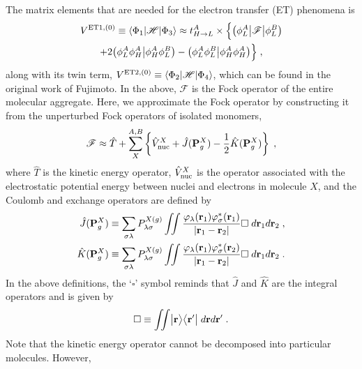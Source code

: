 The matrix elements that are needed for the electron transfer (ET) phenomena
is
%
\begin{multline}\label{e:v0-et1}
 V^{{\rm ET1},(0)} \equiv \left< \Phi_1 \vert \mathscr{H} \vert \Phi_3 \right> \approx 
 t_{H\rightarrow L}^A \times \Big\{ 
 \big( \phi_L^A \big| \mathscr{F} \big| \phi_L^B \big) \\
   + 2 \big( \phi_L^A \phi_H^A \big| \phi_H^A \phi_L^B \big) - \big( \phi_L^A \phi_L^B \big| \phi_H^A \phi_H^A \big) 
 \Big\} \;,
\end{multline}
%
along with its twin term, $V^{{\rm ET2},(0)} \equiv \left< \Phi_2 \vert \mathscr{H} \vert \Phi_4 \right>$,
which can be found in the original work of Fujimoto.
In the above, $\mathscr{F}$ is the Fock operator of the entire molecular aggregate.
Here, we approximate the Fock operator by constructing it from the unperturbed
Fock operators of isolated monomers,
%
\begin{equation}
 \mathscr{F} \approx \hat{T} + 
   \sum_X^{A,B} \left\{ 
      \hat{V}^{X}_{\rm nuc} + \hat{J}({\bf P}^{X}_g) - \frac{1}{2} \hat{K}({\bf P}^{X}_g)
 \right\} \;,
\end{equation}
%
where $\hat{T}$ is the kinetic energy operator, 
$\hat{V}^{X}_{\rm nuc}$ is the operator associated with the electrostatic potential energy
between nuclei and electrons in molecule $X$, and the Coulomb and exchange operators
are defined by
%
\begin{subequations}
\begin{align}
 \hat{J}({\bf P}^{X}_g) &\equiv \sum_{\sigma\lambda} P^{X(g)}_{\lambda\sigma}
           \iint \frac{\varphi_\lambda({\bf r}_1) \varphi^*_\sigma({\bf r}_1) }{\vert {\bf r}_1 - {\bf r}_2 \vert}
           \square \; d{\bf r}_1 d{\bf r}_2 \;,\\
 \hat{K}({\bf P}^{X}_g) &\equiv \sum_{\sigma\lambda} P^{X(g)}_{\lambda\sigma}
           \iint \frac{\varphi_\lambda({\bf r}_1) \varphi^*_\sigma({\bf r}_2) }{\vert {\bf r}_1 - {\bf r}_2 \vert}
           \square \; d{\bf r}_1 d{\bf r}_2 \;.
\end{align} 
\end{subequations}
%
In the above definitions, the `$\square$' symbol reminds that $\hat{J}$ and $\hat{K}$ are the integral operators
and is given by
%
\begin{equation}
 \square \equiv \iint \Ket{{\bf r}} \Bra{{\bf r}'} \; d{\bf r} d{\bf r}' \;.
\end{equation}
%
Note that the kinetic energy operator cannot be decomposed into particular molecules. However, 
